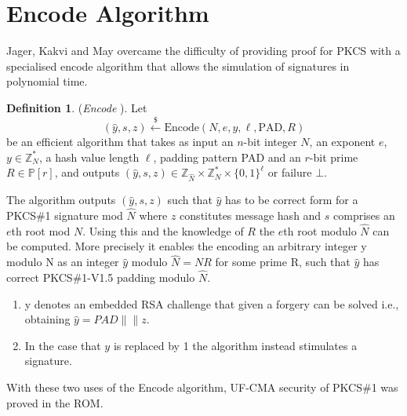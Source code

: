 \documentclass[]{final_report}
\theoremstyle{definition}
\newtheorem{definition}{Definition}[chapter]
\begin{document}
\section{Encode Algorithm}


Jager, Kakvi and May overcame the difficulty of providing proof for PKCS with a specialised encode algorithm that allows the simulation of signatures in polynomial time.  

\begin{definition} (\textit{Encode} \cite{jager2018security}).
Let
\[
(\widehat{y}, s, z) \xleftarrow{\$} \text{Encode}(N, e, y, \ell, \text{PAD}, R)
\]
be an efficient algorithm that takes as input an \(n\)-bit integer \(N\), an exponent \(e\), \(y \in \mathbb{Z}_N^*\), a hash value length $\ell$, padding pattern PAD and an \(r\)-bit prime \(R \in \mathbb{P}[r]\), and outputs \((\widehat{y}, s, z) \in \mathbb{Z}_{\widehat{N}} \times \mathbb{Z}_N^* \times \{0, 1\}^\ell\) or failure \(\bot\). \

\end{definition}

The algorithm outputs \((\widehat{y}, s, z)\) such that \(\widehat{y}\) has to be correct form for a PKCS\#1 signature mod \(\widehat{N}\) where \(z\) constitutes message hash and \(s\) comprises an \(e\)th root mod \(N\). Using this and the knowledge of \(R\) the \(e\)th root modulo \(\widehat{N}\) can be computed. More precisely it enables the encoding an arbitrary integer y modulo N as an integer $\hat{y}$ modulo $\hat{N} = NR$ for some prime R, such that $\hat{y}$ has correct PKCS\#1-V1.5 padding modulo $\hat{N}$.

\begin{enumerate}
\item y denotes an embedded RSA challenge that given a forgery can be solved i.e., obtaining \(\widehat{y} = PAD\|\|z \). 
\item In the case that \(y\) is replaced by 1 the algorithm instead stimulates a signature. 
\end{enumerate}
With these two uses of the Encode algorithm, UF-CMA security of PKCS\#1 was proved in the ROM. 
\end{document}
